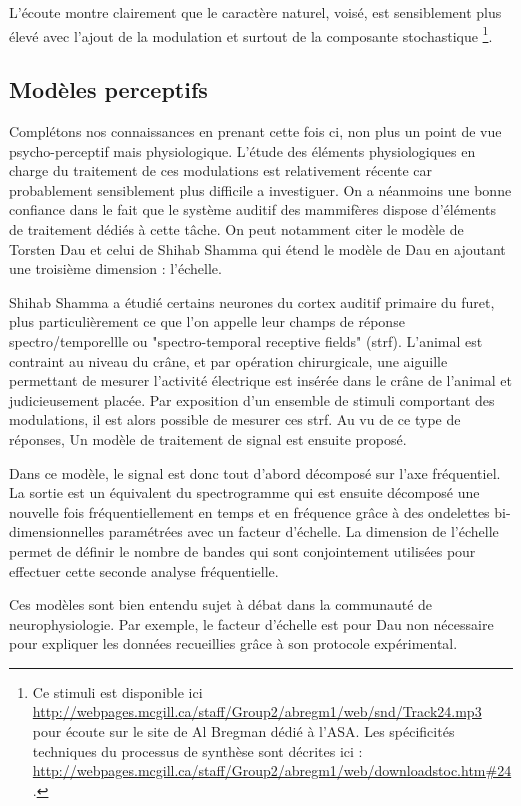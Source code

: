 L'écoute montre clairement que le caractère naturel, voisé, est sensiblement plus élevé avec l'ajout de la modulation et surtout de la composante stochastique \footnote{Ce stimuli est disponible ici \url{http://webpages.mcgill.ca/staff/Group2/abregm1/web/snd/Track24.mp3} pour écoute sur le site de Al Bregman dédié à l'ASA. Les spécificités techniques du processus de synthèse sont décrites ici : \url{http://webpages.mcgill.ca/staff/Group2/abregm1/web/downloadstoc.htm\#24}.}.

\subsection{Modèles perceptifs}

Complétons nos connaissances en prenant cette fois ci, non plus un point de vue psycho-perceptif mais physiologique. L'étude des éléments physiologiques en charge du traitement de ces modulations est relativement récente car probablement sensiblement plus difficile a investiguer. On a néanmoins une bonne confiance dans le fait que le système auditif des mammifères dispose d'éléments de traitement dédiés à cette tâche. On peut notamment citer le modèle de Torsten Dau\cite{dau1997modeling} et celui de Shihab Shamma\cite{fritz2003rapid} qui étend le modèle de Dau en ajoutant une troisième dimension : l'échelle.

Shihab Shamma a étudié certains neurones du cortex auditif primaire du furet, plus particulièrement ce que l'on appelle leur champs de réponse spectro/temporellle ou "spectro-temporal receptive fields" (strf). L'animal est contraint au niveau du crâne, et par opération chirurgicale, une aiguille permettant de mesurer l'activité électrique est insérée dans le crâne de l'animal et judicieusement placée. Par exposition d'un ensemble de stimuli comportant des modulations, il est alors possible de mesurer ces strf. Au vu de ce type de réponses, Un modèle de traitement de signal est ensuite proposé.

Dans ce modèle, le signal est donc tout d'abord décomposé sur l'axe fréquentiel. La sortie est un équivalent du spectrogramme qui est ensuite décomposé une nouvelle fois fréquentiellement en temps et en fréquence grâce à des ondelettes bi-dimensionnelles paramétrées avec un facteur d'échelle. La dimension de l'échelle permet de définir le nombre de bandes qui sont conjointement utilisées pour effectuer cette seconde analyse fréquentielle.

Ces modèles sont bien entendu sujet à débat dans la communauté de neurophysiologie. Par exemple, le facteur d'échelle est pour Dau non nécessaire pour expliquer les données recueillies grâce à son protocole expérimental.

